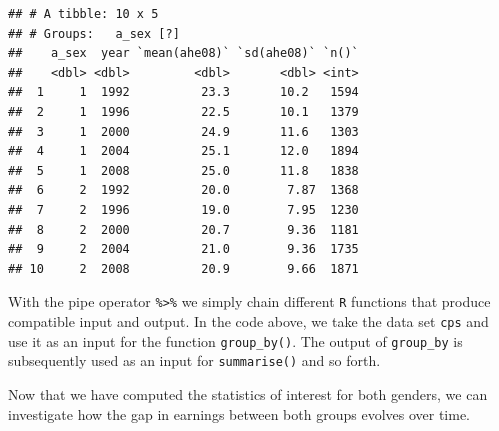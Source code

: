 \documentclass[]{book}
\newenvironment{Shaded}{\begin{snugshade}}{\end{snugshade}}
\newcommand{\KeywordTok}[1]{\textcolor[rgb]{0.13,0.29,0.53}{\textbf{#1}}}
\newcommand{\StringTok}[1]{\textcolor[rgb]{0.31,0.60,0.02}{#1}}
\newcommand{\CommentTok}[1]{\textcolor[rgb]{0.56,0.35,0.01}{\textit{#1}}}
\newcommand{\OperatorTok}[1]{\textcolor[rgb]{0.81,0.36,0.00}{\textbf{#1}}}
\newcommand{\NormalTok}[1]{#1}
\theoremstyle{definition}
\theoremstyle{definition}
\theoremstyle{definition}
\theoremstyle{remark}
\begin{document}
\begin{Shaded}
\end{Shaded}

\begin{verbatim}
## # A tibble: 10 x 5
## # Groups:   a_sex [?]
##    a_sex  year `mean(ahe08)` `sd(ahe08)` `n()`
##    <dbl> <dbl>         <dbl>       <dbl> <int>
##  1     1  1992          23.3       10.2   1594
##  2     1  1996          22.5       10.1   1379
##  3     1  2000          24.9       11.6   1303
##  4     1  2004          25.1       12.0   1894
##  5     1  2008          25.0       11.8   1838
##  6     2  1992          20.0        7.87  1368
##  7     2  1996          19.0        7.95  1230
##  8     2  2000          20.7        9.36  1181
##  9     2  2004          21.0        9.36  1735
## 10     2  2008          20.9        9.66  1871
\end{verbatim}

With the pipe operator \texttt{\%>\%} we simply chain different
\texttt{R} functions that produce compatible input and output. In the
code above, we take the data set \texttt{cps} and use it as an input for
the function \texttt{group\_by()}. The output of \texttt{group\_by} is
subsequently used as an input for \texttt{summarise()} and so forth.

Now that we have computed the statistics of interest for both genders,
we can investigate how the gap in earnings between both groups evolves
over time.
\end{document}
